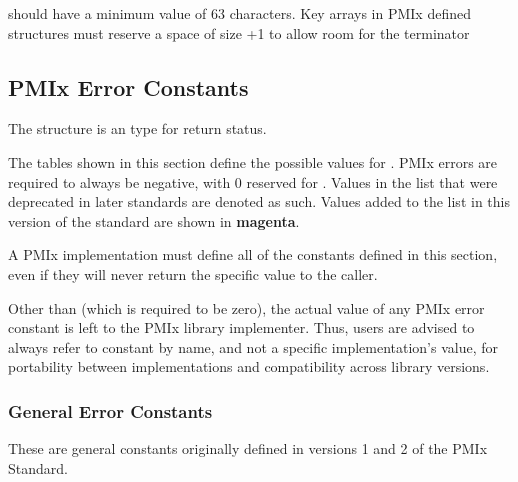 \adviceimplstart
{} should have a minimum value of 63 characters. Key arrays in \ac{PMIx} defined structures must reserve
a space of size +1 to allow room for the  terminator
\adviceimplend


\subsection{PMIx Error Constants}
\label{api:struct:errors}

The  structure is an  type for return status.

The tables shown in this section define the possible values for .
PMIx errors are required to always be negative, with 0 reserved for . Values in the list that were deprecated in later standards are denoted as such. Values added to the list in this version of the standard are shown in \textbf{\color{magenta}magenta}.

\adviceimplstart
A PMIx implementation must define all of the constants defined in this section, even if they will never return the specific value to the caller.
\adviceimplend

\adviceuserstart
Other than  (which is required to be zero), the actual value of any \ac{PMIx} error constant is left to the \ac{PMIx} library implementer. Thus, users are advised to always refer to constant by name, and not a specific implementation's value, for portability between implementations and compatibility across library versions.
\adviceuserend

\subsubsection{General Error Constants}
\label{api:struct:generrors}

These are general constants originally defined in versions 1 and 2 of the PMIx Standard.

